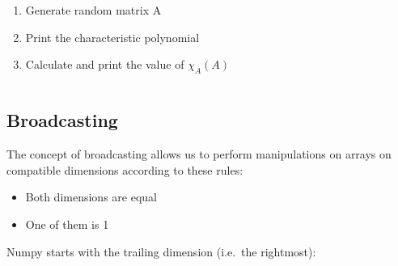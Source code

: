 \documentclass[11pt,a4paper, d]{scrartcl}
\makeatletter
\providecommand{\tightlist}{%
      \setlength{\itemsep}{0pt}\setlength{\parskip}{0pt}}
\newcommand{\boxspacing}{\kern\kvtcb@left@rule\kern\kvtcb@boxsep}
\newcommand{\prompt}[4]{
        \ttfamily\llap{{\color{#2}[#3]:\hspace{3pt}#4}}\vspace{-\baselineskip}
    }
\makeatother
\begin{document}
\begin{enumerate}
\def\labelenumi{\arabic{enumi}.}
\tightlist
\item
  Generate random matrix A
\item
  Print the characteristic polynomial
\item
  Calculate and print the value of \(\chi_A(A)\)
\end{enumerate}

    \begin{tcolorbox}[breakable, size=fbox, boxrule=1pt, pad at break*=1mm,colback=cellbackground, colframe=cellborder]
\prompt{In}{incolor}{ }{\boxspacing}
\begin{Verbatim}[commandchars=\\\{\}]

\end{Verbatim}
\end{tcolorbox}

    \hypertarget{broadcasting}{%
\subsection{Broadcasting}\label{broadcasting}}

The concept of broadcasting allows us to perform manipulations on arrays
on compatible dimensions according to these rules:

\begin{itemize}
\tightlist
\item
  Both dimensions are equal
\item
  One of them is 1
\end{itemize}

Numpy starts with the trailing dimension (i.e.~the rightmost):
\end{document}
